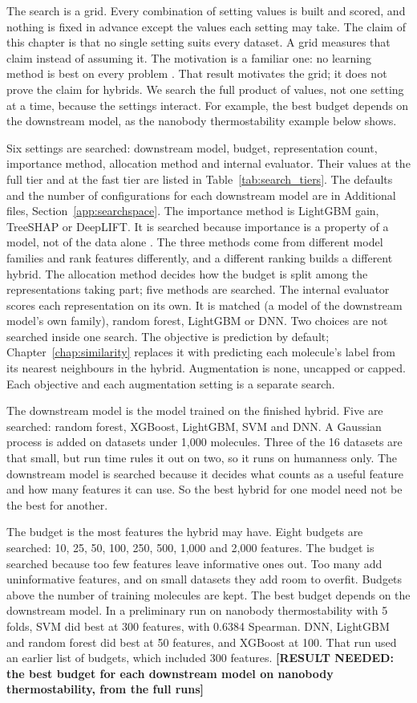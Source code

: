 The search is a grid. Every combination of setting values is built and scored, and nothing is fixed in advance except the values each setting may take. The claim of this chapter is that no single setting suits every dataset. A grid measures that claim instead of assuming it. The motivation is a familiar one: no learning method is best on every problem \citep{Wolpert1996}. That result motivates the grid; it does not prove the claim for hybrids. We search the full product of values, not one setting at a time, because the settings interact. For example, the best budget depends on the downstream model, as the nanobody thermostability example below shows.

Six settings are searched: downstream model, budget, representation count, importance method, allocation method and internal evaluator. Their values at the full tier and at the fast tier are listed in Table~\ref{tab:search_tiers}. The defaults and the number of configurations for each downstream model are in Additional files, Section~\ref{app:searchspace}. The importance method is LightGBM gain, TreeSHAP or DeepLIFT. It is searched because importance is a property of a model, not of the data alone \citep{Dong2020}. The three methods come from different model families and rank features differently, and a different ranking builds a different hybrid. The allocation method decides how the budget is split among the representations taking part; five methods are searched. The internal evaluator scores each representation on its own. It is matched (a model of the downstream model's own family), random forest, LightGBM or DNN. Two choices are not searched inside one search. The objective is prediction by default; Chapter~\ref{chap:similarity} replaces it with predicting each molecule's label from its nearest neighbours in the hybrid. Augmentation is none, uncapped or capped. Each objective and each augmentation setting is a separate search.

The downstream model is the model trained on the finished hybrid. Five are searched: random forest, XGBoost, LightGBM, SVM and DNN. A Gaussian process is added on datasets under 1,000 molecules. Three of the 16 datasets are that small, but run time rules it out on two, so it runs on humanness only. The downstream model is searched because it decides what counts as a useful feature and how many features it can use. So the best hybrid for one model need not be the best for another.

The budget is the most features the hybrid may have. Eight budgets are searched: 10, 25, 50, 100, 250, 500, 1,000 and 2,000 features. The budget is searched because too few features leave informative ones out. Too many add uninformative features, and on small datasets they add room to overfit. Budgets above the number of training molecules are kept. The best budget depends on the downstream model. In a preliminary run on nanobody thermostability with 5 folds, SVM did best at 300 features, with 0.6384 Spearman. DNN, LightGBM and random forest did best at 50 features, and XGBoost at 100. That run used an earlier list of budgets, which included 300 features. \textbf{[RESULT NEEDED: the best budget for each downstream model on nanobody thermostability, from the full runs]}

